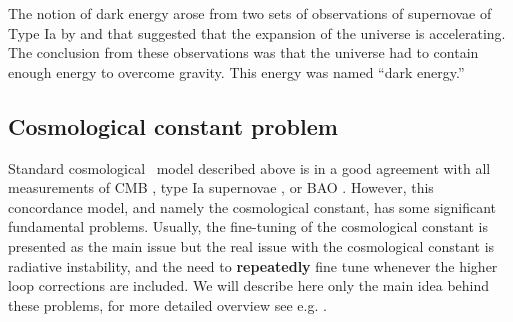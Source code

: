 The notion of dark energy arose from two sets of observations of supernovae of Type Ia by \textcite{riess} and \textcite{1999ApJ...517..565P} that suggested that the expansion of the universe is accelerating. The conclusion from these observations was that the universe had to contain enough energy to overcome gravity. This energy was named “dark energy.”

\subsection{Cosmological constant problem}


Standard cosmological \LCDM\ model described above is in a good agreement with all measurements of CMB \parencite{planck_cosm}, type Ia supernovae \parencite{Abbott_2019}, or BAO \parencite{BAO_results}. However, this concordance model, and namely the cosmological constant, has some significant fundamental problems. Usually, the fine-tuning of the cosmological constant is presented as the main issue but the real issue with the cosmological constant is radiative instability, and the need to \textbf{repeatedly} fine tune whenever the higher loop corrections are included. We will describe here only the main idea behind these problems, for more detailed overview see e.g. \textcite{2015arXiv150205296P,2012CRPhy..13..566M}.

